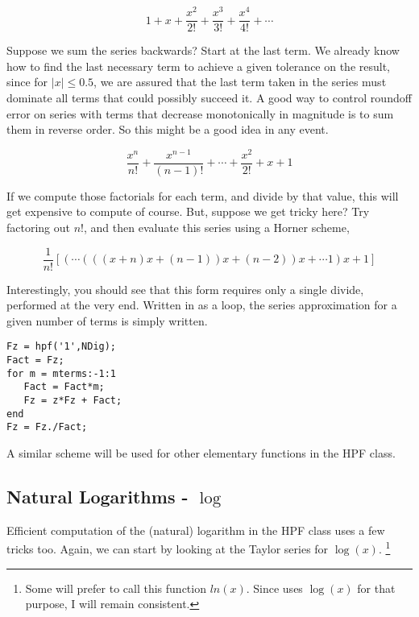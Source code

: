 \documentclass[a4paper,12pt]{article}
\begin{document}
\begin{equation}
    1 + x + \frac{x^2}{2!} + \frac{x^3}{3!} + \frac{x^4}{4!} + \cdots
\end{equation}

Suppose we sum the series backwards? Start at the last term. We already know how to find the last necessary term to achieve a given tolerance on the result, since for $|x| \le 0.5$, we are assured that the last term taken in the series must dominate all terms that could possibly succeed it. A good way to control roundoff error on series with terms that decrease monotonically in magnitude is to sum them in reverse order. So this might be a good idea in any event.

\begin{equation}
    \frac{x^n}{n!} + \frac{x^{n-1}}{(n-1)!} + \cdots + \frac{x^2}{2!} + x + 1
\end{equation}

If we compute those factorials for each term, and divide by that value, this will get expensive to compute of course. But, suppose we get tricky here? Try factoring out $n!$, and then evaluate this series using a Horner scheme,

\begin{equation}
   \frac{1}{n!} [ (\cdots (((x + n)x+(n-1))x + (n-2))x + \cdots 1)x + 1]
\end{equation}

Interestingly, you should see that this form requires only a single divide, performed at the very end. Written in \Ml as a loop, the series approximation for a given number of terms is simply written.

\begin{lstlisting}
Fz = hpf('1',NDig);
Fact = Fz;
for m = mterms:-1:1
   Fact = Fact*m;
   Fz = z*Fz + Fact;
end
Fz = Fz./Fact;
\end{lstlisting}

A similar scheme will be used for other elementary functions in the HPF class.

\subsection{Natural Logarithms - $\log$}

Efficient computation of the (natural) logarithm in the HPF class uses a few tricks too. Again, we can start by looking at the Taylor series for $\log(x)$. \footnote{Some will prefer to call this function $ln(x)$. Since \Ml uses $\log(x)$ for that purpose, I will remain consistent.}
\end{document}
